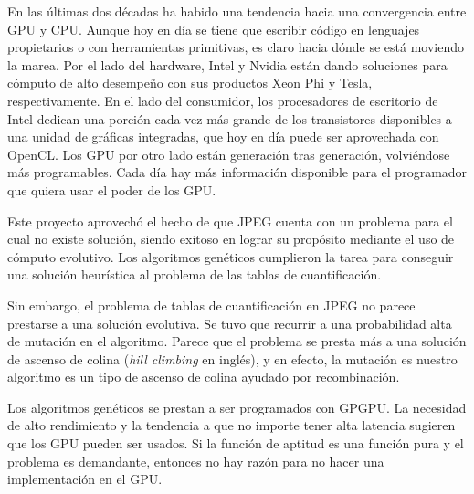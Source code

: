 En las últimas dos décadas ha habido una tendencia hacia una convergencia entre
GPU y CPU. Aunque hoy en día se tiene que escribir código en lenguajes
propietarios o con herramientas primitivas, es claro hacia dónde se está
moviendo la marea. Por el lado del hardware, Intel y Nvidia están dando
soluciones para cómputo de alto desempeño con sus productos Xeon Phi y Tesla,
respectivamente. En el lado del consumidor, los procesadores de escritorio de
Intel dedican una porción cada vez más grande de los transistores disponibles a
una unidad de gráficas integradas, que hoy en día puede ser aprovechada con
OpenCL. Los GPU por otro lado están generación tras generación, volviéndose
más programables. Cada día hay más información disponible para el programador
que quiera usar el poder de los GPU.

Este proyecto aprovechó el hecho de que JPEG cuenta con un problema para el
cual no existe solución, siendo exitoso en lograr su propósito mediante el uso
de \gls{cómputo evolutivo}. Los algoritmos genéticos cumplieron la tarea
para conseguir una solución heurística al problema de las tablas de
cuantificación.

Sin embargo, el problema de tablas de cuantificación en JPEG no parece
prestarse a una solución evolutiva. Se tuvo que recurrir a una probabilidad
alta de mutación en el algoritmo. Parece que el problema se presta más a una
solución de ascenso de colina (\emph{hill climbing} en inglés), y en efecto, la
mutación es nuestro algoritmo es un tipo de ascenso de colina ayudado por
recombinación.

Los algoritmos genéticos se prestan a ser programados con \gls{GPGPU}. La
necesidad de alto rendimiento y la tendencia a que no importe tener alta
latencia sugieren que los GPU pueden ser usados. Si la función de aptitud es
una función pura y el problema es demandante, entonces no hay razón para no
hacer una implementación en el GPU.


